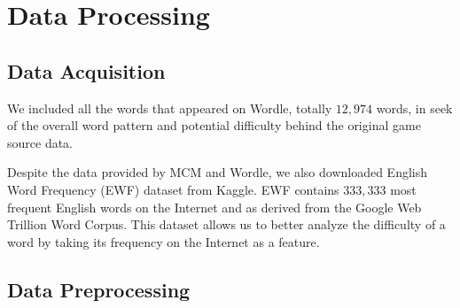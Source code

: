 \documentclass[12pt]{article}
\begin{document}
\section{Data Processing}

\subsection{Data Acquisition}
We included all the words that appeared on Wordle, totally $12,974$ words, in seek of the overall word pattern and potential difficulty behind the original game source data.

\vspace{0.3cm}
\noindent
Despite the data provided by MCM and Wordle, we also downloaded English Word Frequency (EWF) dataset from Kaggle\cite{english}. EWF contains $333,333$ most frequent English words on the Internet and as derived from the Google Web Trillion Word Corpus. This dataset allows us to better analyze the difficulty of a word by taking its frequency on the Internet as a feature.

\subsection{Data Preprocessing}
\end{document}
